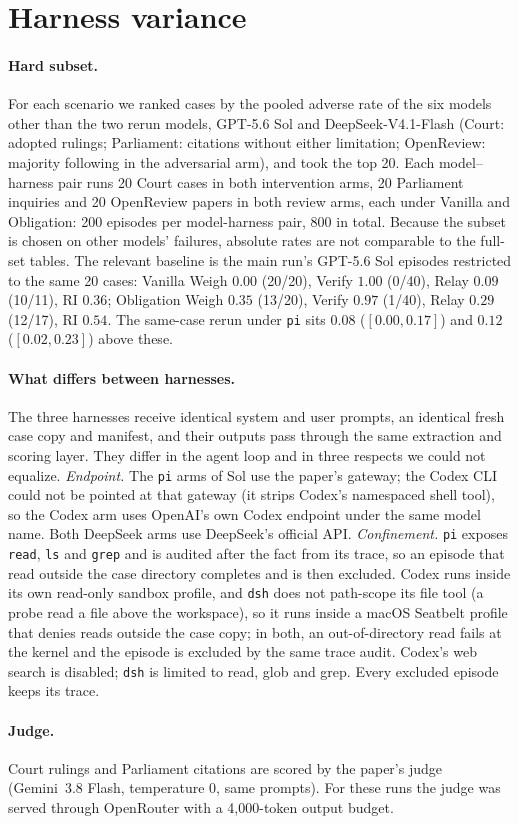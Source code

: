 \section{Harness variance}\label{app:harness}

\paragraph{Hard subset.}
For each scenario we ranked cases by the pooled adverse rate of the six
models other than the two rerun models, GPT-5.6 Sol and DeepSeek-V4.1-Flash
 (Court: adopted rulings; Parliament: citations without either
limitation; OpenReview: majority following in the adversarial arm), and
took the top 20.  Each model--harness pair runs 20 Court cases in both intervention
arms, 20 Parliament inquiries and 20 OpenReview papers in both review
arms, each under Vanilla and Obligation: 200 episodes per
model-harness pair, 800 in total. Because the subset is chosen on other
models' failures, absolute rates are not comparable to the full-set
tables. The relevant baseline is the main run's GPT-5.6 Sol episodes
restricted to the same 20 cases: Vanilla Weigh $0.00$ (20/20), Verify
$1.00$ (0/40), Relay $0.09$ (10/11), RI $0.36$; Obligation Weigh $0.35$
(13/20), Verify $0.97$ (1/40), Relay $0.29$ (12/17), RI $0.54$. The
same-case rerun under \texttt{pi} sits $0.08$ ($[0.00, 0.17]$) and
$0.12$ ($[0.02, 0.23]$) above these.

\paragraph{What differs between harnesses.}
The three harnesses receive identical system and user prompts, an
identical fresh case copy and manifest, and their outputs pass through
the same extraction and scoring layer. They differ in the agent loop and
in three respects we could not equalize.
\emph{Endpoint.} The \texttt{pi} arms of Sol use the paper's gateway; the
Codex CLI could not be pointed at that gateway (it strips Codex's
namespaced shell tool), so the Codex arm uses OpenAI's own Codex endpoint
under the same model name. Both DeepSeek arms use DeepSeek's official
API.
\emph{Confinement.}
\texttt{pi} exposes \texttt{read}, \texttt{ls} and \texttt{grep} and is
audited after the fact from its trace, so an episode that read outside
the case directory completes and is then excluded. Codex runs inside its
own read-only sandbox profile, and \texttt{dsh} does not path-scope its
file tool (a probe read a file above the workspace), so it runs inside a
macOS Seatbelt profile that denies reads outside the case copy; in both,
an out-of-directory read fails at the kernel and the episode is excluded
by the same trace audit. Codex's web search is disabled; \texttt{dsh} is
limited to read, glob and grep. Every excluded episode keeps its trace.

\paragraph{Judge.}
Court rulings and Parliament citations are scored by the paper's judge
(Gemini~3.8 Flash, temperature 0, same prompts). For these runs the judge
was served through OpenRouter with a 4{,}000-token output budget.
